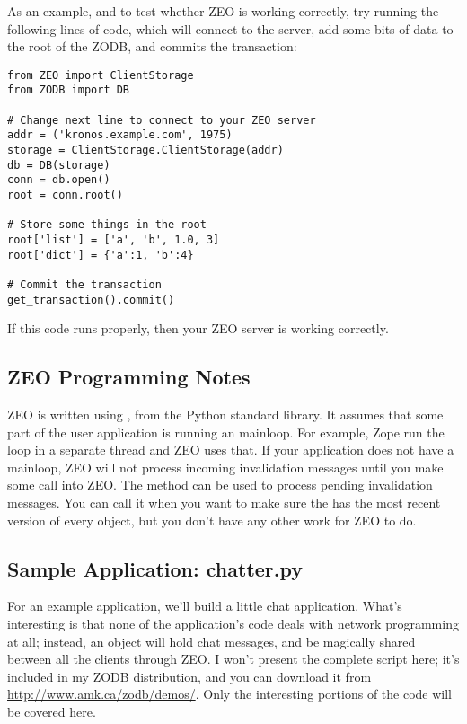 As an example, and to test whether ZEO is working correctly, try
running the following lines of code, which will connect to the server,
add some bits of data to the root of the ZODB, and commits the
transaction:

\begin{verbatim}
from ZEO import ClientStorage
from ZODB import DB

# Change next line to connect to your ZEO server
addr = ('kronos.example.com', 1975)
storage = ClientStorage.ClientStorage(addr)
db = DB(storage)
conn = db.open()
root = conn.root()

# Store some things in the root
root['list'] = ['a', 'b', 1.0, 3]
root['dict'] = {'a':1, 'b':4}

# Commit the transaction
get_transaction().commit()
\end{verbatim}

If this code runs properly, then your ZEO server is working correctly.

\subsection{ZEO Programming Notes}

ZEO is written using , from the Python standard
library.  It assumes that some part of the user application is running
an  mainloop.  For example, Zope run the loop in a
separate thread and ZEO uses that.  If your application does not have
a mainloop, ZEO will not process incoming invalidation messages until
you make some call into ZEO.  The  method can
be used to process pending invalidation messages.  You can call it
when you want to make sure the  has the most recent
version of every object, but you don't have any other work for ZEO to do.

\subsection{Sample Application: chatter.py}

For an example application, we'll build a little chat application.
What's interesting is that none of the application's code deals with
network programming at all; instead, an object will hold chat
messages, and be magically shared between all the clients through ZEO.
I won't present the complete script here; it's included in my ZODB
distribution, and you can download it from
\url{http://www.amk.ca/zodb/demos/}.  Only the interesting portions of
the code will be covered here.

